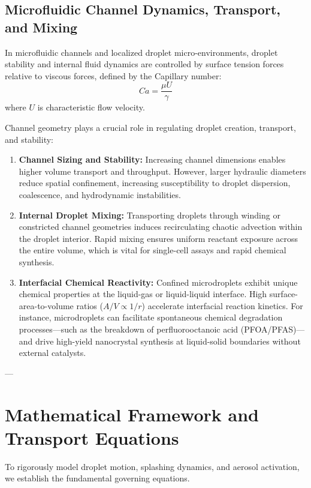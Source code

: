 \documentclass{article}
\begin{document}
\subsection{Microfluidic Channel Dynamics, Transport, and Mixing}
In microfluidic channels and localized droplet micro-environments, droplet stability and internal fluid dynamics are controlled by surface tension forces relative to viscous forces, defined by the Capillary number:
\begin{equation}
Ca = \frac{\mu U}{\gamma}
\end{equation}
where $U$ is characteristic flow velocity.

Channel geometry plays a crucial role in regulating droplet creation, transport, and stability:
\begin{enumerate}
    \item \textbf{Channel Sizing and Stability:} Increasing channel dimensions enables higher volume transport and throughput. However, larger hydraulic diameters reduce spatial confinement, increasing susceptibility to droplet dispersion, coalescence, and hydrodynamic instabilities.
    \item \textbf{Internal Droplet Mixing:} Transporting droplets through winding or constricted channel geometries induces recirculating chaotic advection within the droplet interior. Rapid mixing ensures uniform reactant exposure across the entire volume, which is vital for single-cell assays and rapid chemical synthesis.
    \item \textbf{Interfacial Chemical Reactivity:} Confined microdroplets exhibit unique chemical properties at the liquid-gas or liquid-liquid interface. High surface-area-to-volume ratios ($A/V \propto 1/r$) accelerate interfacial reaction kinetics. For instance, microdroplets can facilitate spontaneous chemical degradation processes—such as the breakdown of perfluorooctanoic acid (PFOA/PFAS)—and drive high-yield nanocrystal synthesis at liquid-solid boundaries without external catalysts.
\end{enumerate}

---

\section{Mathematical Framework and Transport Equations}
\label{sec:math_framework}

To rigorously model droplet motion, splashing dynamics, and aerosol activation, we establish the fundamental governing equations.
\end{document}
